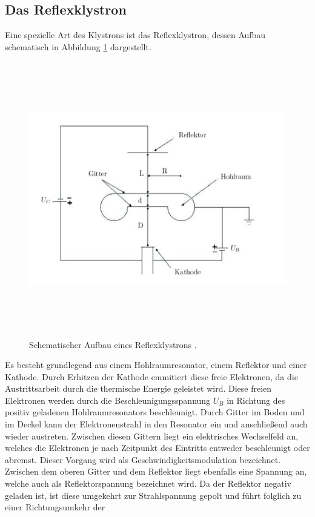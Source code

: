 \subsection{Das Reflexklystron}
Eine spezielle Art des Klystrons ist das Reflexklystron, dessen Aufbau schematisch in Abbildung \ref{fig:kly}
dargestellt.
\begin{figure}[H]
  \centering
  \includegraphics[height=12cm]{kly.png}
  \caption{Schematischer Aufbau eines Reflexklystrons \cite{Kly}.}
  \label{fig:kly}
\end{figure}
Es besteht grundlegend aus einem Hohlraumresonator, einem Reflektor und einer Kathode.
Durch Erhitzen der Kathode emmitiert diese freie Elektronen, da die Austrittsarbeit durch die thermische
Energie geleistet wird. Diese freien Elektronen werden durch die Beschleunigungsspannung $U_B$ in Richtung
des positiv geladenen Hohlraumresonators beschleunigt. Durch Gitter im Boden und im Deckel kann der Elektronenstrahl
in den Resonator ein und anschließend auch wieder austreten. Zwischen diesen Gittern liegt ein elektrisches
Wechselfeld an, welches die Elektronen je nach Zeitpunkt des Eintritts entweder beschleunigt oder
abremst. Dieser Vorgang wird als Geschwindigkeitsmodulation bezeichnet. Zwischen dem oberen Gitter und dem
Reflektor liegt ebenfalls eine Spannung an, welche auch als Reflektorspannung bezeichnet wird. Da der Reflektor negativ
geladen ist, ist diese umgekehrt zur Strahlspannung gepolt und führt folglich zu einer Richtungsumkehr der
